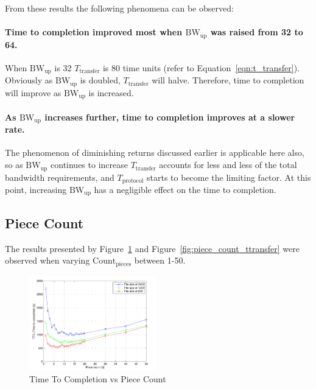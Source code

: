 \documentclass[a4paper,12pt,twocolumn]{article}
\newcommand{\fref}[1]{Figure~\ref{#1}}
\newcommand{\eref}[1]{Equation~\ref{#1}}
\begin{document}
From these results the following phenomena can be observed:

\paragraph{Time to completion improved most when $\text{BW}_{\text{up}}$ was raised from 32 to 64.}
When $\text{BW}_{\text{up}}$ is 32 $T_{\text{transfer}}$ is 80 time units (refer to \eref{eqn:t_transfer}). Obviously as $\text{BW}_{\text{up}}$ is doubled, $T_{\text{transfer}}$ will halve. Therefore, time to completion will improve as $\text{BW}_{\text{up}}$ is increased.

\paragraph{As $\text{BW}_{\text{up}}$ increases further, time to completion improves at a slower rate.}
The phenomenon of diminishing returns discussed earlier is applicable here also, so as $\text{BW}_{\text{up}}$ continues to increase $T_{\text{transfer}}$ accounts for less and less of the total bandwidth requirements, and $T_{\text{protocol}}$ starts to become the limiting factor. At this point, increasing $\text{BW}_{\text{up}}$ has a negligible effect on the time to completion.

\subsection{Piece Count}
\label{subsec:piece_count_results}

The results presented by \fref{fig:piece_count_ttc} and \fref{fig:piece_count_ttransfer} were observed when varying $\text{Count}_{\text{pieces}}$ between 1-50.

\begin{figure}[!htbp]
  \centering
  \includegraphics[width=0.49\textwidth]{figs/Experiment4_TTC}
  \caption{Time To Completion vs Piece Count}
  \label{fig:piece_count_ttc}
\end{figure}
\end{document}
